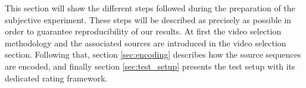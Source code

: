 This section will show the different steps followed during the preparation of the subjective experiment. These steps will be described as precisely as possible in order to guarantee reproducibility of our results. 
At first the video selection methodology and the associated sources are introduced in the video selection section. Following that, section \ref{sec:encoding} describes how the source sequences are encoded, and finally section \ref{sec:test_setup} presents the test setup with its dedicated rating framework. 